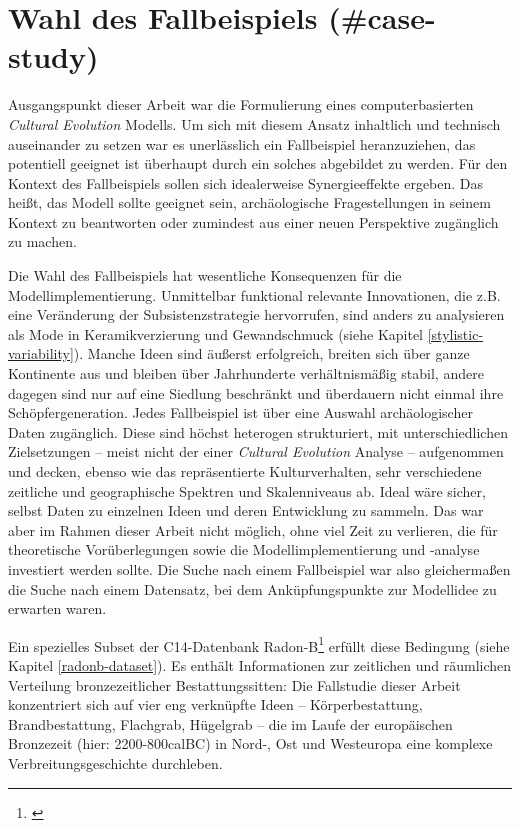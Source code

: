 \documentclass[openany,twoside,twocolumn]{book}
\let\rmarkdownfootnote\footnote%
\def\footnote{\protect\rmarkdownfootnote}
\begin{document}
\hypertarget{wahl-des-fallbeispiels-case-study}{%
\section{Wahl des Fallbeispiels
(\#case-study)}\label{wahl-des-fallbeispiels-case-study}}

Ausgangspunkt dieser Arbeit war die Formulierung eines computerbasierten
\emph{Cultural Evolution} Modells. Um sich mit diesem Ansatz inhaltlich
und technisch auseinander zu setzen war es unerlässlich ein Fallbeispiel
heranzuziehen, das potentiell geeignet ist überhaupt durch ein solches
abgebildet zu werden. Für den Kontext des Fallbeispiels sollen sich
idealerweise Synergieeffekte ergeben. Das heißt, das Modell sollte
geeignet sein, archäologische Fragestellungen in seinem Kontext zu
beantworten oder zumindest aus einer neuen Perspektive zugänglich zu
machen.

Die Wahl des Fallbeispiels hat wesentliche Konsequenzen für die
Modellimplementierung. Unmittelbar funktional relevante Innovationen,
die z.B. eine Veränderung der Subsistenzstrategie hervorrufen, sind
anders zu analysieren als Mode in Keramikverzierung und Gewandschmuck
(siehe Kapitel \ref{stylistic-variability}). Manche Ideen sind äußerst
erfolgreich, breiten sich über ganze Kontinente aus und bleiben über
Jahrhunderte verhältnismäßig stabil, andere dagegen sind nur auf eine
Siedlung beschränkt und überdauern nicht einmal ihre Schöpfergeneration.
Jedes Fallbeispiel ist über eine Auswahl archäologischer Daten
zugänglich. Diese sind höchst heterogen strukturiert, mit
unterschiedlichen Zielsetzungen -- meist nicht der einer \emph{Cultural
Evolution} Analyse -- aufgenommen und decken, ebenso wie das
repräsentierte Kulturverhalten, sehr verschiedene zeitliche und
geographische Spektren und Skalenniveaus ab. Ideal wäre sicher, selbst
Daten zu einzelnen Ideen und deren Entwicklung zu sammeln. Das war aber
im Rahmen dieser Arbeit nicht möglich, ohne viel Zeit zu verlieren, die
für theoretische Vorüberlegungen sowie die Modellimplementierung und
-analyse investiert werden sollte. Die Suche nach einem Fallbeispiel war
also gleichermaßen die Suche nach einem Datensatz, bei dem
Anküpfungspunkte zur Modellidee zu erwarten waren.

Ein spezielles Subset der C14-Datenbank Radon-B\footnote{\textcite{kneisel_radon-b_2013}}
erfüllt diese Bedingung (siehe Kapitel \ref{radonb-dataset}). Es enthält
Informationen zur zeitlichen und räumlichen Verteilung bronzezeitlicher
Bestattungssitten: Die Fallstudie dieser Arbeit konzentriert sich auf
vier eng verknüpfte Ideen -- Körperbestattung, Brandbestattung,
Flachgrab, Hügelgrab -- die im Laufe der europäischen Bronzezeit (hier:
2200-800calBC) in Nord-, Ost und Westeuropa eine komplexe
Verbreitungsgeschichte durchleben.
\end{document}
